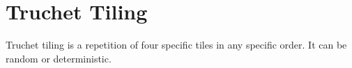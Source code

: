 \documentclass[12pt,openany,a4,usenames,dvipsnames]{book}
\begin{document}
\section{Truchet Tiling}
Truchet tiling is a repetition of four specific tiles in any specific order. It can be random or deterministic.
\begin{figure}[H]
\centering
  \begin{minipage}{\textwidth}
\centering
  \begin{minipage}{0.20\textwidth}
    \hfill
    \hfill
  \end{minipage}
  \hspace{0.028\textwidth}
  \begin{minipage}{0.20\textwidth}
    \hfill

\end{minipage}
\end{minipage}
\end{figure}
\end{document}
